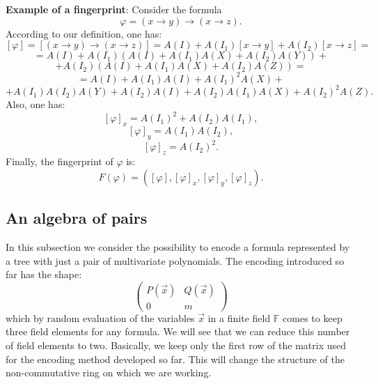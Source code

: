 \documentclass{article}
\theoremstyle{plain}
\theoremstyle{definition}
\begin{document}
{\bf Example of a fingerprint}: Consider the formula
$$\varphi = (x \rightarrow y) \rightarrow (x \rightarrow z).$$
According to our definition, one has:
$$[\varphi] = [(x \rightarrow y) \rightarrow (x \rightarrow z)] = A(I) + A(I_1)[x \rightarrow y] + A(I_2) [x \rightarrow z] =$$
$$= A(I) + A(I_1)(A(I) + A(I_1)A(X) + A(I_2)A(Y)) +$$$$+ A(I_2)(A(I) + A(I_1)A(X)+A(I_2)A(Z)) = $$
$$= A(I) + A(I_1)A(I) + A(I_1)^2A(X) + $$$$+ A(I_1)A(I_2)A(Y) + A(I_2)A(I) + A(I_2)A(I_1)A(X) + A(I_2)^2 A(Z).$$
Also, one has:
$$[\varphi]_x = A(I_1)^2 + A(I_2)A(I_1),$$
$$[\varphi]_y = A(I_1)A(I_2),$$
$$[\varphi]_z = A(I_2)^2.$$
Finally, the fingerprint of $\varphi$ is:
$$F(\varphi) = ([\varphi], [\varphi]_x, [\varphi]_y, [\varphi]_z).$$
\begin{center}
\end{center}
\subsection{An algebra of pairs}

In this subsection we consider the possibility to encode a formula represented by a tree with just a pair of multivariate polynomials. The encoding introduced so far has the shape:
$$
\begin{pmatrix}
    P(\vec x) & Q(\vec x) \\ 0 & m
\end{pmatrix}
$$
which by random evaluation of the variables $\vec x$ in a finite field $\mathbb F$ comes to keep three field elements for any formula. We will see that we can reduce this number of field elements to two. Basically, we keep only the first row of the matrix used for the encoding method developed so far. This will change the structure of the non-commutative ring on which we are working. 
\end{document}
